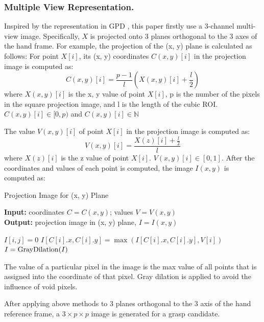 \documentclass[letterpaper]{article} %
\begin{document}
\subsubsection{Multiple View Representation.}
Inspired by the representation in GPD \cite{RN6}, this paper firstly use a 3-channel multi-view image. Specifically, $X$ is projected onto 3 planes orthogonal to the 3 axes of the hand frame. For example, the projection of the (x, y) plane is calculated as follows:
For point $X[i]$, its (x, y) coordinates $C(x, y)[i]$ in the projection image is computed as:
\begin{equation}
    C(x, y)[i]=\frac{p-1}{l} (X(x, y)[i] + \frac {l} 2)
\end{equation}
where $X(x, y)[i]$ is the x, y value of point $X[i]$, p is the number of the pixels in the square projection image, and l is the length of the cubic ROI. $C(x, y)[i]\in [0, p)$ and $C(x, y)[i]\in \mathbb{N}$

The value $V(x, y)[i]$ of point $X[i]$ in the projection image is computed as:
\begin{equation}
    V(x, y)[i]=\frac{X(z)[i]+\frac{l}{2}}{l}
\end{equation}
where $X(z)[i]$ is the z value of point $X[i]$. $V(x, y)[i]\in [0, 1]$. After the coordinates and values of each point is computed, the image $I(x, y)$ is computed as:

\begin{algorithm}[H]
\caption{Projection Image for (x, y) Plane}
\textbf{Input:} coordinates $C=C(x, y)$; values $V=V(x, y)$\\
\textbf{Output:} projection image in (x, y) plane, $I=I(x,y)$ \\
\begin{algorithmic}[1]
\STATE $I[i, j] = 0$
\ENDFOR
\ENDFOR
{}
\STATE $I[C[i].x, C[i].y]=\max(I[C[i].x, C[i].y], V[i])$
\ENDFOR
\STATE $I={\rm GrayDilation}(I)$
\end{algorithmic}
\end{algorithm}

The value of a particular pixel in the image is the max value of all points that is assigned into the coordinate of that pixel. Gray dilation \cite{BK1} is applied to avoid the influence of void pixels.

After applying above methods to 3 planes orthogonal to the 3 axis of the hand reference frame, a $3\times p \times p$ image is generated for a grasp candidate.
\end{document}
